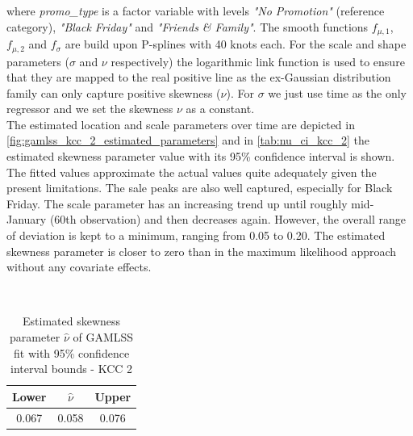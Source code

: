 where \textit{promo\_type} is a factor variable with levels \textit{"No Promotion"} (reference category), \textit{"Black Friday"} and \textit{"Friends \& Family"}. The smooth functions $f_{\mu ,1}$, $f_{\mu ,2}$ and $f_{\sigma}$ are build upon P-splines with 40 knots each. For the scale and shape parameters ($\sigma$ and $\nu$ respectively) the logarithmic link function is used to ensure that they are mapped to the real positive line as the ex-Gaussian distribution family can only capture positive skewness ($\nu$). For $\sigma$ we just use time as the only regressor and we set the skewness $\nu$ as a constant.\\
 The estimated location and scale parameters over time are depicted in \autoref{fig:gamlss_kcc_2_estimated_parameters} and in \autoref{tab:nu_ci_kcc_2} the estimated skewness parameter value with its 95\% confidence interval is shown. The fitted values approximate the actual values quite adequately given the present limitations. The sale peaks are also well captured, especially for Black Friday. The scale parameter has an increasing trend up until roughly mid-January (60th observation) and then decreases again. However, the overall range of deviation is kept to a minimum, ranging from 0.05 to 0.20. The estimated skewness parameter is closer to zero than in the maximum likelihood approach without any covariate effects.
\\


\begin{table}[H]
\setlength\arrayrulewidth{1pt}  
\centering
\begin{adjustbox}{max width=\textwidth}\
\begin{tabular}{c|c|c}
\hline
\rowcolor{white} 
\textbf{Lower} & $\hat{\nu}$ & \textbf{Upper} \\ \hline\hline
0.067        & 0.058           & 0.076        \\ \hline
\end{tabular}
\end{adjustbox}
\caption{Estimated skewness parameter $\hat{\nu}$ of GAMLSS fit with 95\% confidence interval bounds - KCC 2}
\label{tab:nu_ci_kcc_2}
\end{table}


